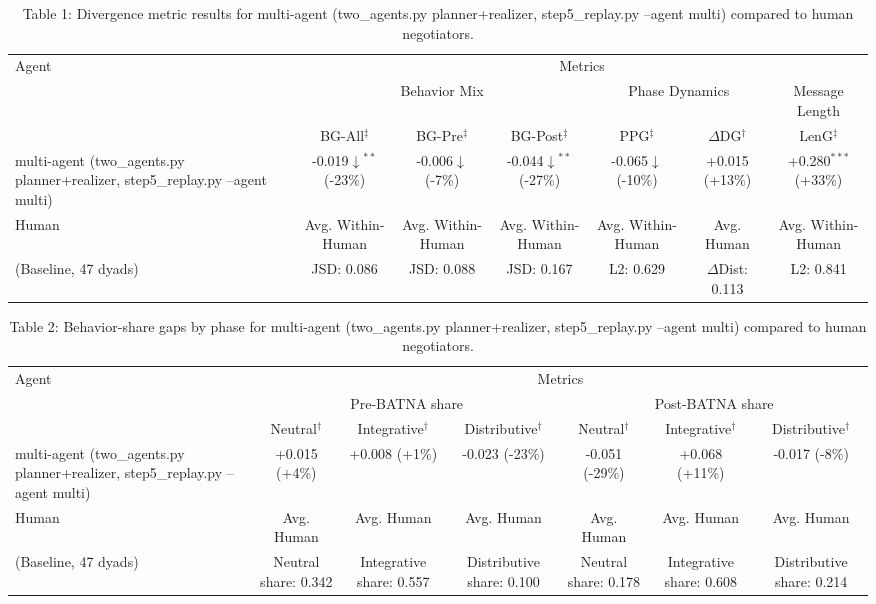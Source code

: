 \begin{table}[t]
\centering
\begin{tabular}{lcccccc}
\toprule
\multirow{3}{*}{Agent} & \multicolumn{6}{c}{Metrics} \\
\cmidrule(lr){2-7}
 & \multicolumn{3}{c}{Behavior Mix} & \multicolumn{2}{c}{Phase Dynamics} & \multicolumn{1}{c}{Message Length} \\
\cmidrule(lr){2-4} \cmidrule(lr){5-6} \cmidrule(lr){7-7}
 & BG-All$^\ddagger$ & BG-Pre$^\ddagger$ & BG-Post$^\ddagger$ & PPG$^\ddagger$ & $\Delta$DG$^\dagger$ & LenG$^\ddagger$ \\
\midrule
multi-agent (two_agents.py planner+realizer, step5_replay.py --agent multi) & -0.019$\downarrow$$^{**}$ (-23\%) & -0.006$\downarrow$ (-7\%) & -0.044$\downarrow$$^{**}$ (-27\%) & -0.065$\downarrow$ (-10\%) & +0.015 (+13\%) & +0.280$^{***}$ (+33\%) \\
\midrule
Human & Avg. Within-Human & Avg. Within-Human & Avg. Within-Human & Avg. Within-Human & Avg. Human & Avg. Within-Human \\
(Baseline, 47 dyads) & JSD: 0.086 & JSD: 0.088 & JSD: 0.167 & L2: 0.629 & $\Delta$Dist: 0.113 & L2: 0.841 \\
\bottomrule
\end{tabular}
\caption{Table 1: Divergence metric results for multi-agent (two_agents.py planner+realizer, step5_replay.py --agent multi) compared to human negotiators.}
\end{table}

\begin{table}[t]
\centering
\begin{tabular}{lcccccc}
\toprule
\multirow{3}{*}{Agent} & \multicolumn{6}{c}{Metrics} \\
\cmidrule(lr){2-7}
 & \multicolumn{3}{c}{Pre-BATNA share} & \multicolumn{3}{c}{Post-BATNA share} \\
\cmidrule(lr){2-4} \cmidrule(lr){5-7}
 & Neutral$^\dagger$ & Integrative$^\dagger$ & Distributive$^\dagger$ & Neutral$^\dagger$ & Integrative$^\dagger$ & Distributive$^\dagger$ \\
\midrule
multi-agent (two_agents.py planner+realizer, step5_replay.py --agent multi) & +0.015 (+4\%) & +0.008 (+1\%) & -0.023 (-23\%) & -0.051 (-29\%) & +0.068 (+11\%) & -0.017 (-8\%) \\
\midrule
Human & Avg. Human & Avg. Human & Avg. Human & Avg. Human & Avg. Human & Avg. Human \\
(Baseline, 47 dyads) & Neutral share: 0.342 & Integrative share: 0.557 & Distributive share: 0.100 & Neutral share: 0.178 & Integrative share: 0.608 & Distributive share: 0.214 \\
\bottomrule
\end{tabular}
\caption{Table 2: Behavior-share gaps by phase for multi-agent (two_agents.py planner+realizer, step5_replay.py --agent multi) compared to human negotiators.}
\end{table}
